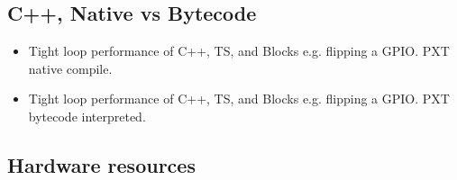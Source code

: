 \subsection{C++, Native vs Bytecode}
\begin{itemize}
\item Tight loop performance of C++, TS, and Blocks e.g. flipping a GPIO. PXT native compile.
\item Tight loop performance of C++, TS, and Blocks e.g. flipping a GPIO. PXT bytecode interpreted.
\end{itemize}

\subsection{Hardware resources}


